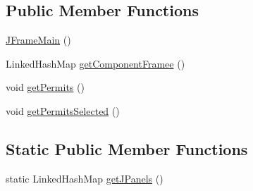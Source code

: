 \subsection*{Public Member Functions}
\begin{DoxyCompactItemize}
\item 
\hyperlink{classcom_1_1eneri_1_1scorpio__metertool_1_1ui_1_1_j_frame_main_a0efa81daeeea8c69668203246d2ad033}{J\+Frame\+Main} ()
\item 
Linked\+Hash\+Map \hyperlink{classcom_1_1eneri_1_1scorpio__metertool_1_1ui_1_1_j_frame_main_acc7768b342f0b03f3dff99bd15e8114b}{get\+Component\+Framee} ()
\item 
void \hyperlink{classcom_1_1eneri_1_1scorpio__metertool_1_1ui_1_1_j_frame_main_a06d3f662c3d3fc2e0c15e93b3676bc7f}{get\+Permits} ()
\item 
void \hyperlink{classcom_1_1eneri_1_1scorpio__metertool_1_1ui_1_1_j_frame_main_a3c3858f697c08f6b7573f3e8644e1c46}{get\+Permits\+Selected} ()
\end{DoxyCompactItemize}
\subsection*{Static Public Member Functions}
\begin{DoxyCompactItemize}
\item 
static Linked\+Hash\+Map \hyperlink{classcom_1_1eneri_1_1scorpio__metertool_1_1ui_1_1_j_frame_main_a0774b476cfce1d3f8bf6cea2d54b2fd7}{get\+J\+Panels} ()
\end{DoxyCompactItemize}
